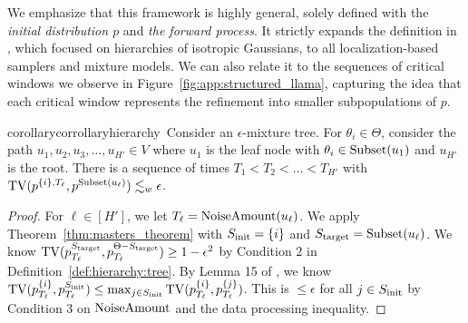 We emphasize that this framework is highly general, solely defined with the \emph{initial distribution $p$} and \emph{the forward process}. It strictly expands the definition in \citep{li2024criticalwindowsnonasymptotictheory}, which focused on hierarchies of isotropic Gaussians, to all localization-based samplers and mixture models. We can also relate it to the sequences of critical windows we observe in Figure~\ref{fig:app:structured_llama}, capturing the idea that each critical window represents the refinement into smaller subpopulations of $p$.   
\begin{restatable}{corollary}{corrollaryhierarchy}\label{corr:hierarchy_example}\ Consider an $\epsilon$-mixture tree. For $\theta_i \in \Theta$, consider the path $u_1,u_2,u_3,\dots,u_{H'} \in V$ where $u_1$ is the leaf node with $\theta_i \in \text{\textrm{Subset}}(u_1)$ and $u_{H'}$ is the root. There is a sequence of times $T_1<T_{2}<\dots<T_{H'}$ with $\TV(\modrevlaw{\{i\}}{T_\ell}{}, p^{\textrm{\subsetfunc}(u_\ell)}) \lesssim_{w} \epsilon$.
\end{restatable} 
\begin{proof}
For $\ell \in [H']$, we let $T_\ell = \textrm{NoiseAmount}(u_\ell)$. We apply Theorem~\ref{thm:masters_theorem} with $S_{\mathrm{init}}=\{i\}$ and $S_{\mathrm{target}}=\textrm{Subset}(u_\ell)$. We know $\mathrm{TV}(p^{S_{\mathrm{target}}}_{T_\ell},p^{\Theta-S_{\mathrm{target}}}_{T_\ell}) \geq 1-\epsilon^2$ by Condition $2$ in Definition~\ref{def:hierarchy:tree}. By Lemma 15 of \citep{li2024criticalwindowsnonasymptotictheory}, we know $\mathrm{TV}(p^{\{i\}}_{T_\ell},p^{S_{\mathrm{init}}}_{T_\ell}) \leq \max_{j \in S_{\mathrm{init}}} \mathrm{TV}(p^{\{i\}}_{T_\ell},p^{\{j\}}_{T_\ell})$. This is $\leq \epsilon$ for all $j \in S_{\mathrm{init}}$ by Condition 3 on $\textrm{NoiseAmount}$ and the data processing inequality. 
\end{proof}


